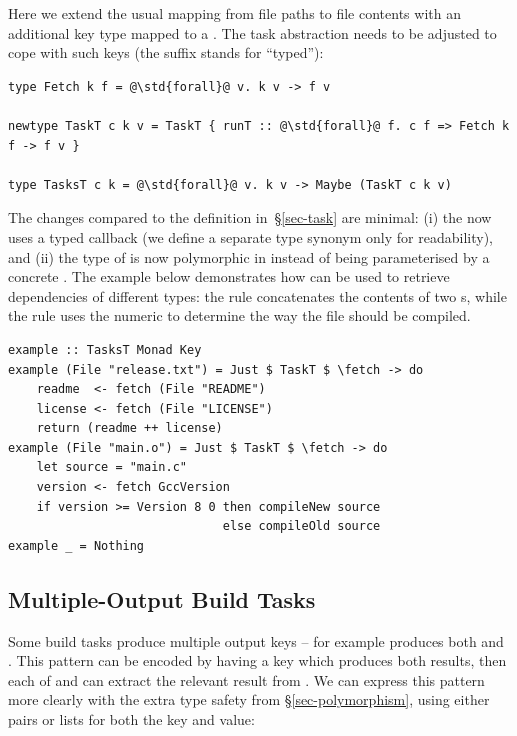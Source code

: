 \noindent
Here we extend the usual mapping from file paths to file contents with an
additional key type  mapped to a . The task
abstraction needs to be adjusted to cope with such keys (the suffix 
stands for ``typed''):

\vspace{1mm}
\begin{verbatim}
type Fetch k f = @\std{forall}@ v. k v -> f v

newtype TaskT c k v = TaskT { runT :: @\std{forall}@ f. c f => Fetch k f -> f v }

type TasksT c k = @\std{forall}@ v. k v -> Maybe (TaskT c k v)
\end{verbatim}
\vspace{1mm}

\noindent
The changes compared to the definition in~\S\ref{sec-task} are minimal: (i) the
 now uses a typed  callback (we define a separate type
synonym only for readability), and (ii) the type of  is now
polymorphic in  instead of being parameterised by a concrete . The
example below demonstrates how  can be used to retrieve dependencies
of different types: the rule  concatenates the contents of two
s, while the rule  uses the numeric  to
determine the way the  file should be compiled.

\vspace{1mm}
\begin{verbatim}
example :: TasksT Monad Key
example (File "release.txt") = Just $ TaskT $ \fetch -> do
    readme  <- fetch (File "README")
    license <- fetch (File "LICENSE")
    return (readme ++ license)
example (File "main.o") = Just $ TaskT $ \fetch -> do
    let source = "main.c"
    version <- fetch GccVersion
    if version >= Version 8 0 then compileNew source
                              else compileOld source
example _ = Nothing
\end{verbatim}
\vspace{1mm}

\subsection{Multiple-Output Build Tasks}\label{sec-multiple-outputs}

Some build tasks produce multiple output keys -- for example  produces both
 and . This pattern can be encoded by having a key  which produces
both results, then each of  and  can extract the relevant result
from . We can express this pattern more clearly with the extra type safety from
\S\ref{sec-polymorphism}, using either pairs or lists for both the key and value:

